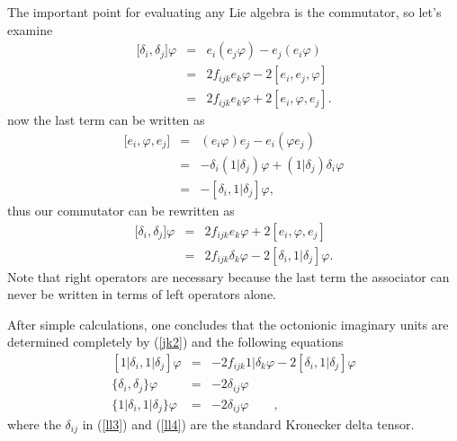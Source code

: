 \documentclass[a4paper,12pt]{book}
\begin{document}
The important point for evaluating any Lie algebra is the commutator, so
let's examine 
\begin{eqnarray}
\lbrack \delta _{i},\delta _{j}]\varphi &=&e_{i}(e_{j}\varphi
)-e_{j}(e_{i}\varphi ) \\
&=&2f_{ijk}e_{k}\varphi -2[e_{i},e_{j},\varphi ] \\
&=&2f_{ijk}e_{k}\varphi +2[e_{i},\varphi ,e_{j}].
\end{eqnarray}
now the last term can be written as 
\begin{eqnarray}
\lbrack e_{i},\varphi ,e_{j}] &=&(e_{i}\varphi )e_{j}-e_{i}(\varphi e_{j}) \\
&=&-\delta _{i}(1|\delta _{j})\varphi +(1|\delta _{j})\delta _{i}\varphi \\
&=&-[\delta _{i},1|\delta _{j}]\varphi ,
\end{eqnarray}
thus our commutator can be rewritten as 
\begin{eqnarray}
\lbrack \delta _{i},\delta _{j}]\varphi &=&2f_{ijk}e_{k}\varphi
+2[e_{i},\varphi ,e_{j}]  \label{jk1} \\
&=&2f_{ijk}\delta _{k}\varphi -2[\delta _{i},1|\delta _{j}]\varphi .
\label{jk2}
\end{eqnarray}
Note that right operators are necessary because the last term the associator
can never be written in terms of left operators alone.

After simple calculations, one concludes that the octonionic imaginary units
are determined completely by (\ref{jk2}) and the following equations 
\begin{eqnarray}
\left[ 1|\delta _{i},1|\delta _{j}\right] \varphi &=&-2f_{ijk}1|\delta
_{k}\varphi -2[\delta _{i},1|\delta _{j}]\varphi  \label{ll2} \\
\{\delta _{i},\delta _{j}\}\varphi &=&-2\delta _{ij}\varphi  \label{ll3} \\
\{1|\delta _{i},1|\delta _{j}\}\varphi &=&-2\delta _{ij}\varphi \qquad ,
\label{ll4}
\end{eqnarray}
where the $\delta _{ij}$ in (\ref{ll3}) and (\ref{ll4}) are the standard
Kronecker delta tensor.
\end{document}
